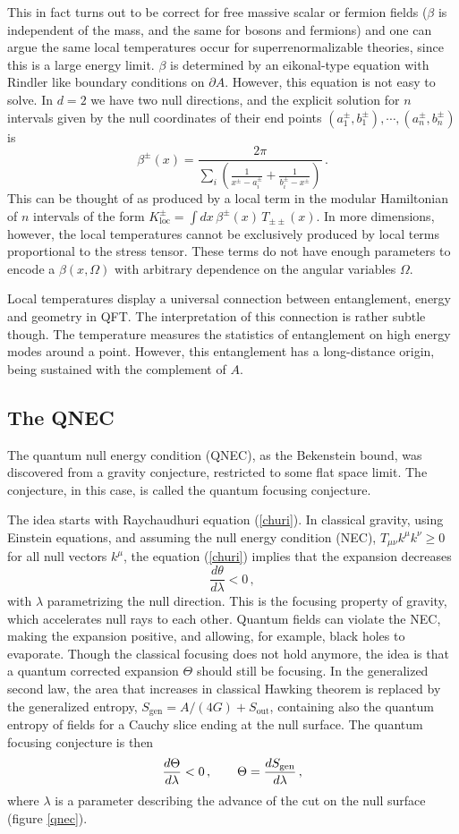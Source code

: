 \documentclass[11pt]{article}
\numberwithin{equation}{section}
\newcommand{\be}{\begin{equation}}
\newcommand{\ee}{\end{equation}}
\begin{document}
This in fact turns out to be correct for free massive scalar or fermion fields  ($\beta$ is independent of the mass, and the same for bosons and fermions) and one can argue the same local temperatures occur for superrenormalizable theories, since this is a large energy limit. $\beta$ is determined by an eikonal-type equation with Rindler like boundary conditions on $\partial A$. However, this equation is not easy to solve. In $d=2$ we have two null directions, and the explicit solution for $n$ intervals given by the null coordinates of their end points $(a_1^\pm,b_1^\pm),\cdots, (a_n^\pm,b_n^\pm)$ is
\be
\beta^\pm(x)=\frac{2\pi}{\sum_i \left(\frac{1}{x^\pm-a_i^\pm}+\frac{1}{b_i^\pm-x^\pm}\right)}\,.  
\ee
This can be thought of as produced by a local term in the modular Hamiltonian of $n$ intervals of the form $K^\pm_{\textrm{loc}}= \int dx\, \beta^\pm(x)\, T_{\pm\pm}(x)$. In more dimensions, however, the local temperatures cannot be exclusively produced by local terms proportional to the stress tensor. These terms do not have enough parameters to encode a $\beta(x,\Omega)$ with arbitrary dependence on the angular variables $\Omega$. 

Local temperatures display a universal connection between entanglement, energy and geometry in QFT. The interpretation of this connection is rather subtle though. The temperature measures the statistics of entanglement on high energy modes around a point. However, this entanglement has a long-distance origin, being sustained with the complement of $A$.     

\subsection{The QNEC}
The quantum null energy condition (QNEC), as the Bekenstein bound, was discovered from a gravity conjecture, restricted to some flat space limit. The conjecture, in this case, is called the quantum focusing conjecture. 

The idea starts with Raychaudhuri equation (\ref{churi}). In classical gravity, using Einstein equations, and assuming the null energy condition (NEC), $T_{\mu\nu}k^\mu k^\nu\ge 0$ for all null vectors $k^\mu$, the equation (\ref{churi}) implies that the expansion decreases
\be
\frac{d\theta}{d\lambda}<0\,,
\ee
with $\lambda$ parametrizing the null direction. 
 This is the focusing property of gravity, which accelerates null rays to each other. Quantum fields can violate the NEC, making the expansion positive, and allowing, for example, black holes to evaporate. Though the classical focusing does not hold anymore, the idea is that a quantum corrected expansion $\Theta$ should still be focusing. In the generalized second law, the area that increases in classical Hawking theorem is replaced by the generalized entropy, $S_{\textrm{gen}}=A/(4G)+S_{\textrm{out}}$, containing also the quantum entropy of fields for a Cauchy slice ending at the null surface. The quantum focusing conjecture is then
 \be
 \frac{d\Theta}{d\lambda}<0\,,\hspace{.7cm} \Theta= \frac{dS_{\textrm{gen}}}{d\lambda}\,,   
\ee
where $\lambda$ is a parameter describing the advance of the cut on the null surface (figure \ref{qnec}). 
\end{document}
